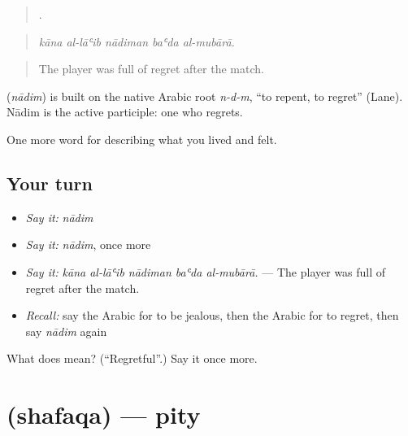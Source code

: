 \begin{quote}
    .
\end{quote}

\begin{quote}
\emph{kāna al-lāʿib nādiman baʿda al-mubārā.}
\end{quote}

\begin{quote}
The player was full of regret after the match.
\end{quote}

\begin{cousinweb}
\textbf{} (\emph{nādim}) is built on the native Arabic root \emph{n-d-m}, \textquotedblleft{}to repent, to regret\textquotedblright{} (Lane). Nādim is the active participle: one who regrets.
\end{cousinweb}

\begin{grammarlens}[title={What you've built}]
One more word for describing what you lived and felt.
\end{grammarlens}

\subsection*{Your turn}
\begin{itemize}
\raggedright
  \item \emph{Say it:} \emph{nādim}
  \item \emph{Say it:} \emph{nādim}, once more
  \item \emph{Say it:} \emph{kāna al-lāʿib nādiman baʿda al-mubārā.} — The player was full of regret after the match.
  \item \emph{Recall:} say the Arabic for to be jealous, then the Arabic for to regret, then say \emph{nādim} again
\end{itemize}

\begin{tcolorbox}[breakable,colback=teal!4,colframe=teal!35!black,title={Before you move on}]
What does  mean? (\textquotedblleft{}Regretful\textquotedblright{}.) Say it once more.
\end{tcolorbox}
\section[\texorpdfstring{\ar{شفقة} (shafaqa)}{شفقة (shafaqa)}]{ (shafaqa) — pity}

\label{lesson:AR-C493-shafaqa}



